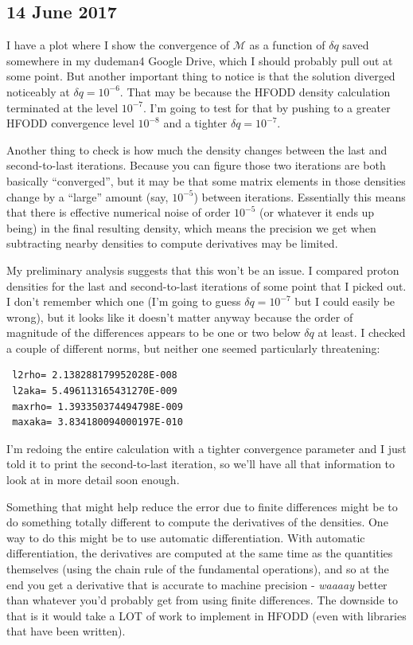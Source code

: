 \documentclass[]{report}
\begin{document}
\subsection*{14 June 2017}
I have a plot where I show the convergence of $\mathcal{M}$ as a function of $\delta q$ saved somewhere in my dudeman4 Google Drive, which I should probably pull out at some point. But another important thing to notice is that the solution diverged noticeably at $\delta q = 10^{-6}$. That may be because the HFODD density calculation terminated at the level $10^{-7}$. I'm going to test for that by pushing to a greater HFODD convergence level $10^{-8}$ and a tighter $\delta q = 10^{-7}$.

Another thing to check is how much the density changes between the last and second-to-last iterations. Because you can figure those two iterations are both basically ``converged'', but it may be that some matrix elements in those densities change by a ``large'' amount (say, $10^{-5}$) between iterations. Essentially this means that there is effective numerical noise of order $10^{-5}$ (or whatever it ends up being) in the final resulting density, which means the precision we get when subtracting nearby densities to compute derivatives may be limited.

My preliminary analysis suggests that this won't be an issue. I compared proton densities for the last and second-to-last iterations of some point that I picked out. I don't remember which one (I'm going to guess $\delta q = 10^{-7}$ but I could easily be wrong), but it looks like it doesn't matter anyway because the order of magnitude of the differences appears to be one or two below $\delta q$ at least. I checked a couple of different norms, but neither one seemed particularly threatening:

\begin{verbatim}
 l2rho= 2.138288179952028E-008
 l2aka= 5.496113165431270E-009
 maxrho= 1.393350374494798E-009
 maxaka= 3.834180094000197E-010
\end{verbatim}

I'm redoing the entire calculation with a tighter convergence parameter and I just told it to print the second-to-last iteration, so we'll have all that information to look at in more detail soon enough.

Something that might help reduce the error due to finite differences might be to do something totally different to compute the derivatives of the densities. One way to do this might be to use automatic differentiation. With automatic differentiation, the derivatives are computed at the same time as the quantities themselves (using the chain rule of the fundamental operations), and so at the end you get a derivative that is accurate to machine precision - \textit{waaaay} better than whatever you'd probably get from using finite differences. The downside to that is it would take a LOT of work to implement in HFODD (even with libraries that have been written).
\end{document}
